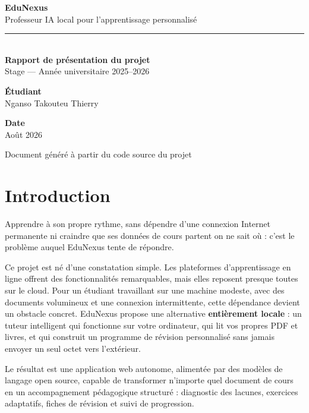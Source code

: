 \documentclass[11pt,a4paper]{article}
\begin{document}
\begin{titlepage}
\centering
\vspace*{2.5cm}
{\Huge\bfseries\color{dark} EduNexus}\\[0.5cm]
{\Large\color{gray} Professeur IA local pour l'apprentissage personnalisé}\\[2cm]
\rule{\textwidth}{1pt}\\[1.5cm]
{\large\textbf{Rapport de présentation du projet}}\\[0.6cm]
{\large Stage --- Année universitaire 2025--2026}\\[3cm]
\begin{minipage}{0.55\textwidth}
\centering
\textbf{Étudiant}\\[0.3cm]
Nganso Takouteu Thierry
\end{minipage}
\hfill
\begin{minipage}{0.35\textwidth}
\centering
\textbf{Date}\\[0.3cm]
Août 2026
\end{minipage}
\vfill
{\small\color{gray} Document généré à partir du code source du projet}
\end{titlepage}

\tableofcontents
\newpage

\section{Introduction}

Apprendre à son propre rythme, sans dépendre d'une connexion Internet permanente ni craindre que ses données de cours partent on ne sait où : c'est le problème auquel EduNexus tente de répondre.

Ce projet est né d'une constatation simple. Les plateformes d'apprentissage en ligne offrent des fonctionnalités remarquables, mais elles reposent presque toutes sur le cloud. Pour un étudiant travaillant sur une machine modeste, avec des documents volumineux et une connexion intermittente, cette dépendance devient un obstacle concret. EduNexus propose une alternative \textbf{entièrement locale} : un tuteur intelligent qui fonctionne sur votre ordinateur, qui lit vos propres PDF et livres, et qui construit un programme de révision personnalisé sans jamais envoyer un seul octet vers l'extérieur.

Le résultat est une application web autonome, alimentée par des modèles de langage open source, capable de transformer n'importe quel document de cours en un accompagnement pédagogique structuré : diagnostic des lacunes, exercices adaptatifs, fiches de révision et suivi de progression.
\end{document}

